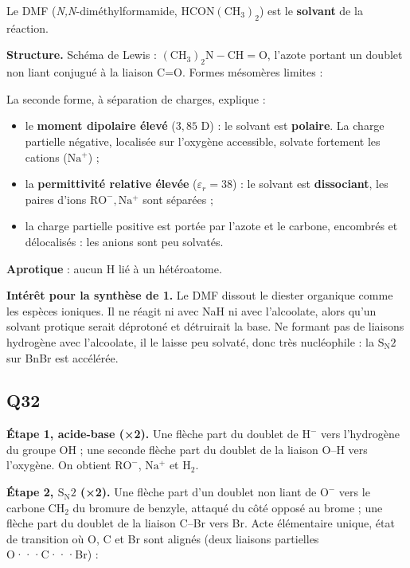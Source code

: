 \documentclass[11pt,a4paper]{article}
\providecommand{\tightlist}{\setlength{\itemsep}{0pt}\setlength{\parskip}{0pt}}
\newcommand{\equationajustee}[1]{%
  \sbox{\boiteequation}{$\displaystyle #1$}%
  \ifdim\wd\boiteequation>\linewidth
    \[\resizebox{\linewidth}{!}{\usebox{\boiteequation}}\]%
  \else
    \[#1\]%
  \fi}
\begin{document}
Le DMF (\emph{N,N}-diméthylformamide, \(\mathrm{HCON(CH_3)_2}\)) est le \textbf{solvant} de la réaction.

\textbf{Structure.} Schéma de Lewis : \(\mathrm{(CH_3)_2N{-}CH{=}O}\), l'azote portant un doublet non liant conjugué à la liaison C=O. Formes mésomères limites :

\equationajustee{\mathrm{(CH_3)_2\ddot N{-}CH{=}O}\ \longleftrightarrow\ \mathrm{(CH_3)_2N^+{=}CH{-}O^-}}

La seconde forme, à séparation de charges, explique :

\begin{itemize}
\tightlist
\item
  le \textbf{moment dipolaire élevé} (\(3{,}85\) D) : le solvant est \textbf{polaire}. La charge partielle négative, localisée sur l'oxygène accessible, solvate fortement les cations (\(\mathrm{Na^+}\)) ;
\item
  la \textbf{permittivité relative élevée} (\(\varepsilon_r=38\)) : le solvant est \textbf{dissociant}, les paires d'ions \(\mathrm{RO^-,Na^+}\) sont séparées ;
\item
  la charge partielle positive est portée par l'azote et le carbone, encombrés et délocalisés : les anions sont peu solvatés.
\end{itemize}

\textbf{Aprotique} : aucun H lié à un hétéroatome.

\textbf{Intérêt pour la synthèse de 1.} Le DMF dissout le diester organique comme les espèces ioniques. Il ne réagit ni avec NaH ni avec l'alcoolate, alors qu'un solvant protique serait déprotoné et détruirait la base. Ne formant pas de liaisons hydrogène avec l'alcoolate, il le laisse peu solvaté, donc très nucléophile : la \(\mathrm{S_N2}\) sur BnBr est accélérée.

\hypertarget{q32}{%
\subsection{Q32}\label{q32}}

\textbf{Étape 1, acide-base (×2).} Une flèche part du doublet de \(\mathrm{H^-}\) vers l'hydrogène du groupe OH ; une seconde flèche part du doublet de la liaison O--H vers l'oxygène. On obtient \(\mathrm{RO^-}\), \(\mathrm{Na^+}\) et \(\mathrm{H_2}\).

\textbf{Étape 2, \(\mathrm{S_N2}\) (×2).} Une flèche part d'un doublet non liant de \(\mathrm{O^-}\) vers le carbone \(\mathrm{CH_2}\) du bromure de benzyle, attaqué du côté opposé au brome ; une flèche part du doublet de la liaison C--Br vers Br. Acte élémentaire unique, état de transition où O, C et Br sont alignés (deux liaisons partielles O···C···Br) :
\end{document}
